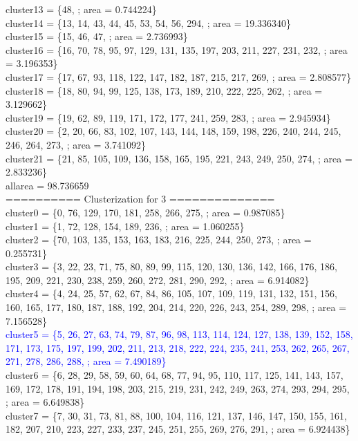 \documentclass[a4paper,12pt, titlepage]{article}
\begin{document}
cluster13 = \{48, ; area = 0.744224\}\\
cluster14 = \{13, 14, 43, 44, 45, 53, 54, 56, 294, ; area = 19.336340\}\\
cluster15 = \{15, 46, 47, ; area = 2.736993\}\\
cluster16 = \{16, 70, 78, 95, 97, 129, 131, 135, 197, 203, 211, 227, 231, 232, ; area = 3.196353\}\\
cluster17 = \{17, 67, 93, 118, 122, 147, 182, 187, 215, 217, 269, ; area = 2.808577\}\\
cluster18 = \{18, 80, 94, 99, 125, 138, 173, 189, 210, 222, 225, 262, ; area = 3.129662\}\\
cluster19 = \{19, 62, 89, 119, 171, 172, 177, 241, 259, 283, ; area = 2.945934\}\\
cluster20 = \{2, 20, 66, 83, 102, 107, 143, 144, 148, 159, 198, 226, 240, 244, 245, 246, 264, 273, ; area = 3.741092\}\\
cluster21 = \{21, 85, 105, 109, 136, 158, 165, 195, 221, 243, 249, 250, 274, ; area = 2.833236\}\\
allarea = 98.736659\\
\newpage
==========  Clusterization for 3 ==============\\
cluster0 = \{0, 76, 129, 170, 181, 258, 266, 275, ; area = 0.987085\}\\
cluster1 = \{1, 72, 128, 154, 189, 236, ; area = 1.060255\}\\
cluster2 = \{70, 103, 135, 153, 163, 183, 216, 225, 244, 250, 273, ; area = 0.255731\}\\
cluster3 = \{3, 22, 23, 71, 75, 80, 89, 99, 115, 120, 130, 136, 142, 166, 176, 186, 195, 209, 221, 230, 238, 259, 260, 272, 281, 290, 292, ; area = 6.914082\}\\
cluster4 = \{4, 24, 25, 57, 62, 67, 84, 86, 105, 107, 109, 119, 131, 132, 151, 156, 160, 165, 177, 180, 187, 188, 192, 204, 214, 220, 226, 243, 254, 289, 298, ; area = 7.156528\}\\
\textcolor{blue}
{
cluster5 = \{5, 26, 27, 63, 74, 79, 87, 96, 98, 113, 114, 124, 127, 138, 139, 152, 158, 171, 173, 175, 197, 199, 202, 211, 213, 218, 222, 224, 235, 241, 253, 262, 265, 267, 271, 278, 286, 288, ; area = 7.490189\}\\
}
cluster6 = \{6, 28, 29, 58, 59, 60, 64, 68, 77, 94, 95, 110, 117, 125, 141, 143, 157, 169, 172, 178, 191, 194, 198, 203, 215, 219, 231, 242, 249, 263, 274, 293, 294, 295, ; area = 6.649838\}\\
cluster7 = \{7, 30, 31, 73, 81, 88, 100, 104, 116, 121, 137, 146, 147, 150, 155, 161, 182, 207, 210, 223, 227, 233, 237, 245, 251, 255, 269, 276, 291, ; area = 6.924438\}\\
\end{document}
